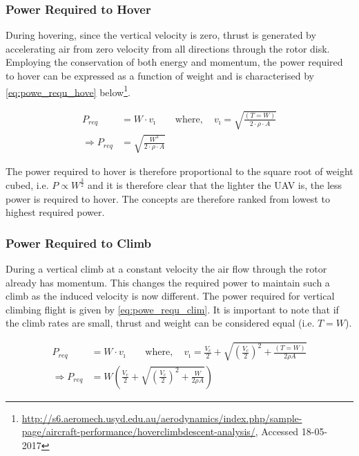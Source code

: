 \subsubsection*{Power Required to Hover}
During hovering, since the vertical velocity is zero, thrust is generated by accelerating air from zero velocity from all directions through the rotor disk. Employing the conservation of both energy and momentum, the power required to hover can be expressed as a function of weight and is characterised by \autoref{eq:powe_requ_hove} below\footnote{\url{http://s6.aeromech.usyd.edu.au/aerodynamics/index.php/sample-page/aircraft-performance/hoverclimbdescent-analysis/}, Accessed 18-05-2017}.

\begin{equation}
\label{eq:powe_requ_hove}
\begin{split}
  P_{req} &= W \cdot v_{\imath} \qquad \mathrm{where,} \quad v_{\imath} = \sqrt{\frac{(T = W)}{2 \cdot \rho \cdot A}}\\
\Rightarrow  P_{req} &= \sqrt{\frac{W^3}{2 \cdot \rho \cdot A}}
\end{split}
\end{equation}


The power required to hover is therefore proportional to the square root of weight cubed, i.e. $P \propto W^{\frac{3}{2}}$ and it is therefore clear that the lighter the UAV is, the less power is required to hover. The concepts are therefore ranked from lowest to highest required power.

\subsubsection*{Power Required to Climb}

During a vertical climb at a constant velocity the air flow through the rotor already has momentum. This changes the required power to maintain such a climb as the induced velocity is now different. The power required for vertical climbing flight is given by \autoref{eq:powe_requ_clim}. It is important to note that if the climb rates are small, thrust and weight can be considered equal (i.e. $T = W$).

\begin{equation}
\label{eq:powe_requ_clim}
\begin{split}
  P_{req} &= W \cdot v_{\imath} \qquad \mathrm{where,} \quad v_{\imath} = \frac{V_{c}}{2} + \sqrt{ \left( \frac{V_{c}}{2} \right) ^2 + \frac{(T = W)}{2 \rho A}}\\
  \Rightarrow P_{req} &= W \left( \frac{V_{c}}{2} + \sqrt{ \left( \frac{V_{c}}{2} \right) ^2 + \frac{W}{2 \rho A}} \right)
\end{split}
\end{equation}

